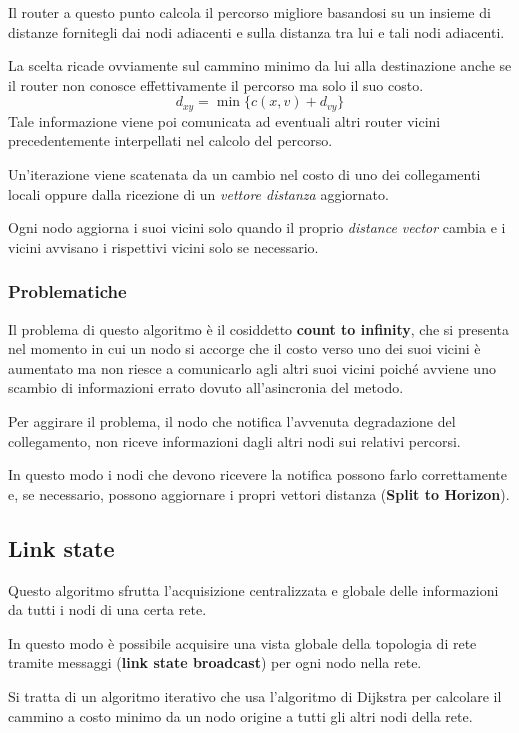 Il router a questo punto calcola il percorso migliore basandosi su un 
insieme di distanze fornitegli dai nodi adiacenti e sulla distanza tra
lui e tali nodi adiacenti.

La scelta ricade ovviamente sul cammino minimo da lui alla destinazione
anche se il router non conosce effettivamente il percorso ma solo il 
suo costo.
\[ d_{xy} = \min \{ c(x, v) + d_{vy} \} \]
Tale informazione viene poi comunicata ad eventuali altri router vicini
precedentemente interpellati nel calcolo del percorso.

Un'iterazione viene scatenata da un cambio nel costo di uno dei 
collegamenti locali oppure dalla ricezione di un \emph{vettore 
distanza} aggiornato.

Ogni nodo aggiorna i suoi vicini solo quando il proprio \emph{distance
vector} cambia e i vicini avvisano i rispettivi vicini solo se
necessario.

\subsubsection{Problematiche}
Il problema di questo algoritmo è il cosiddetto \textbf{count to
infinity}, che si presenta nel momento in cui un nodo si accorge che
il costo verso uno dei suoi vicini è aumentato ma non riesce a
comunicarlo agli altri suoi vicini poiché avviene uno scambio di
informazioni errato dovuto all'asincronia del metodo.

Per aggirare il problema, il nodo che notifica l'avvenuta degradazione
del collegamento, non riceve informazioni dagli altri nodi sui relativi
percorsi.

In questo modo i nodi che devono ricevere la notifica possono farlo 
correttamente e, se necessario, possono aggiornare i propri vettori 
distanza (\textbf{Split to Horizon}).

\subsection{Link state}
Questo algoritmo sfrutta l'acquisizione centralizzata e globale delle 
informazioni da tutti i nodi di una certa rete.

In questo modo è possibile acquisire una vista globale della topologia
di rete tramite messaggi (\textbf{link state broadcast}) per ogni nodo
nella rete.

Si tratta di un algoritmo iterativo che usa l'algoritmo di Dijkstra
per calcolare il cammino a costo minimo da un nodo origine a tutti gli
altri nodi della rete.

